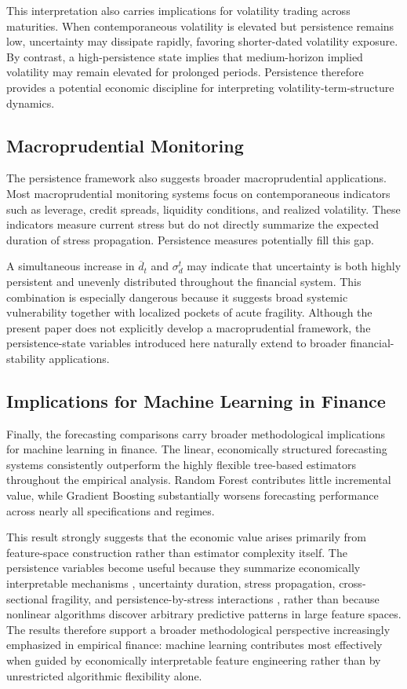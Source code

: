 \documentclass[unnumsec,webpdf,contemporary,large]{oup-authoring-template}%
\theoremstyle{thmstyleone}%
\theoremstyle{thmstyletwo}%
\theoremstyle{thmstylethree}%
\begin{document}
This interpretation also carries implications for volatility trading across
maturities. When contemporaneous volatility is elevated but persistence
remains low, uncertainty may dissipate rapidly, favoring shorter-dated
volatility exposure. By contrast, a high-persistence state implies that
medium-horizon implied volatility may remain elevated for prolonged periods.
Persistence therefore provides a potential economic discipline for
interpreting volatility-term-structure dynamics.

\subsection{Macroprudential Monitoring}

The persistence framework also suggests broader macroprudential
applications. Most macroprudential monitoring systems focus on
contemporaneous indicators such as leverage, credit spreads, liquidity
conditions, and realized volatility. These indicators measure current
stress but do not directly summarize the expected duration of stress
propagation. Persistence measures potentially fill this gap.

A simultaneous increase in $\overline d_t$ and $\sigma_d^t$ may indicate
that uncertainty is both highly persistent and unevenly distributed
throughout the financial system. This combination is especially dangerous
because it suggests broad systemic vulnerability together with localized
pockets of acute fragility. Although the present paper does not explicitly
develop a macroprudential framework, the persistence-state variables
introduced here naturally extend to broader financial-stability
applications.

\subsection{Implications for Machine Learning in Finance}

Finally, the forecasting comparisons carry broader methodological
implications for machine learning in finance. The linear, economically
structured forecasting systems consistently outperform the highly flexible
tree-based estimators throughout the empirical analysis. Random Forest
contributes little incremental value, while Gradient Boosting substantially
worsens forecasting performance across nearly all specifications and
regimes.

This result strongly suggests that the economic value arises primarily from
feature-space construction rather than estimator complexity itself. The
persistence variables become useful because they summarize economically
interpretable mechanisms , uncertainty duration, stress propagation,
cross-sectional fragility, and persistence-by-stress interactions ,
rather than because nonlinear algorithms discover arbitrary predictive
patterns in large feature spaces. The results therefore support a broader
methodological perspective increasingly emphasized in empirical finance:
machine learning contributes most effectively when guided by economically
interpretable feature engineering rather than by unrestricted algorithmic
flexibility alone.
\end{document}
